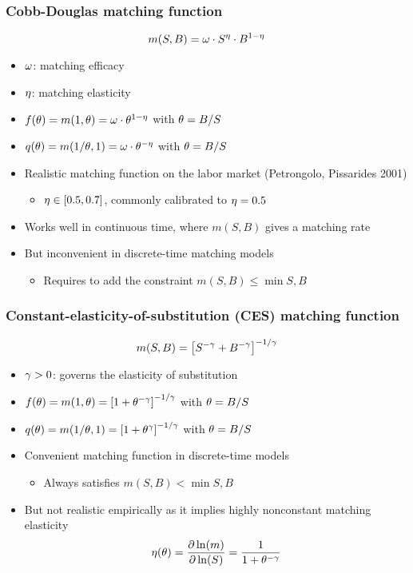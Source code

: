 \documentclass[11pt,aspectratio=169,xcolor={dvipsnames},hyperref={pdftex,pdfpagemode=UseNone,hidelinks,pdfdisplaydoctitle=true},usepdftitle=false]{beamer}
\begin{document}
\begin{frame}
\frametitle{Cobb-Douglas matching function}
\vspace*{-7mm}\begin{equation*}
m(S,B) = \omega \cdot S^\eta \cdot B^{1-\eta}
\end{equation*}\vspace*{-7mm}
\begin{itemize}
\item $\omega$: matching efficacy 
\item $\eta$: matching elasticity
\item $f(\theta) = m(1,\theta) = \omega \cdot \theta^{1-\eta}$ with $\theta = B/S$
\item $q(\theta) = m(1/\theta,1) = \omega \cdot \theta^{-\eta}$ with $\theta = B/S$
\item Realistic matching function on the labor market (Petrongolo, Pissarides 2001)
\begin{itemize}
	\item $\eta \in [0.5,0.7]$, commonly calibrated to $\eta = 0.5$
\end{itemize}
\item Works well in continuous time, where $m(S,B)$ gives a matching rate
\item But inconvenient in discrete-time matching models
\begin{itemize}
	\item Requires to add the constraint $m(S,B) \leq \min{S,B}$
\end{itemize}
\end{itemize}
\end{frame}

\begin{frame}
\frametitle{Constant-elasticity-of-substitution (CES) matching function}
\vspace*{-7mm}\begin{equation*}
m(S,B) = \left[ S^{-\gamma} + B^{-\gamma} \right]^{-1/\gamma}
\end{equation*}\vspace*{-7mm}
\begin{itemize}
\item $\gamma>0$: governs the elasticity of substitution 
\item $f(\theta) = m(1,\theta) = \left[ 1 + \theta^{-\gamma} \right]^{-1/\gamma}$ with $\theta = B/S$
\item $q(\theta) = m(1/\theta,1) = \left[ 1+ \theta^{\gamma} \right]^{-1/\gamma}$ with $\theta = B/S$
\item Convenient matching function in discrete-time models
\begin{itemize}
	\item Always satisfies $m(S,B)<\min{S,B}$
\end{itemize}
\item But not realistic empirically as it implies highly nonconstant matching elasticity
\begin{equation*}
\h(\t) = \pe{m}{S} = \frac{1}{1 + \t^{-\g}}
\end{equation*}
\end{itemize}	
\end{frame}
\end{document}
